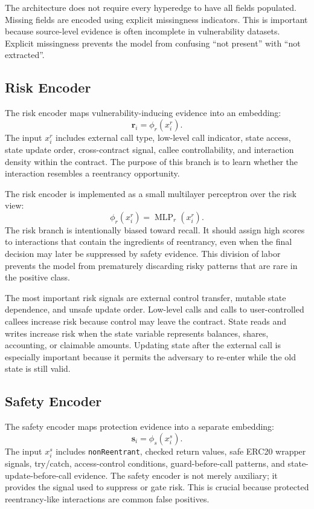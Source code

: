 \documentclass[conference]{IEEEtran}
\begin{document}
The architecture does not require every hyperedge to have all fields populated. Missing fields are encoded using explicit missingness indicators. This is important because source-level evidence is often incomplete in vulnerability datasets. Explicit missingness prevents the model from confusing ``not present'' with ``not extracted''.

\subsection{Risk Encoder}

The risk encoder maps vulnerability-inducing evidence into an embedding:
\begin{equation}
\mathbf{r}_i=\phi_r(x_i^r).
\end{equation}
The input $x_i^r$ includes external call type, low-level call indicator, state access, state update order, cross-contract signal, callee controllability, and interaction density within the contract. The purpose of this branch is to learn whether the interaction resembles a reentrancy opportunity.

The risk encoder is implemented as a small multilayer perceptron over the risk view:
\begin{equation}
\phi_r(x_i^r)=\operatorname{MLP}_r(x_i^r).
\end{equation}
The risk branch is intentionally biased toward recall. It should assign high scores to interactions that contain the ingredients of reentrancy, even when the final decision may later be suppressed by safety evidence. This division of labor prevents the model from prematurely discarding risky patterns that are rare in the positive class.

The most important risk signals are external control transfer, mutable state dependence, and unsafe update order. Low-level calls and calls to user-controlled callees increase risk because control may leave the contract. State reads and writes increase risk when the state variable represents balances, shares, accounting, or claimable amounts. Updating state after the external call is especially important because it permits the adversary to re-enter while the old state is still valid.

\subsection{Safety Encoder}

The safety encoder maps protection evidence into a separate embedding:
\begin{equation}
\mathbf{s}_i=\phi_s(x_i^s).
\end{equation}
The input $x_i^s$ includes \texttt{nonReentrant}, checked return values, safe ERC20 wrapper signals, try/catch, access-control conditions, guard-before-call patterns, and state-update-before-call evidence. The safety encoder is not merely auxiliary; it provides the signal used to suppress or gate risk. This is crucial because protected reentrancy-like interactions are common false positives.
\end{document}
